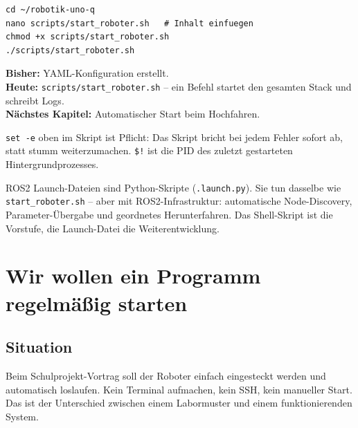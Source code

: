 \begin{loesungBox}
\begin{lstlisting}[style=bash]
cd ~/robotik-uno-q
nano scripts/start_roboter.sh   # Inhalt einfuegen
chmod +x scripts/start_roboter.sh
./scripts/start_roboter.sh
\end{lstlisting}
\end{loesungBox}

\begin{projektBox}
\textbf{Bisher:} YAML-Konfiguration erstellt.\\
\textbf{Heute:} \texttt{scripts/start\_roboter.sh} -- ein Befehl
startet den gesamten Stack und schreibt Logs.\\
\textbf{Nächstes Kapitel:} Automatischer Start beim Hochfahren.
\end{projektBox}

\begin{merksatzBox}
\texttt{set -e} oben im Skript ist Pflicht: Das Skript bricht
bei jedem Fehler sofort ab, statt stumm weiterzumachen.
\texttt{\$!} ist die PID des zuletzt gestarteten Hintergrundprozesses.
\end{merksatzBox}

\begin{robotikBox}
ROS2 Launch-Dateien sind Python-Skripte (\texttt{.launch.py}).
Sie tun dasselbe wie \texttt{start\_roboter.sh} -- aber mit
ROS2-Infrastruktur: automatische Node-Discovery, Parameter-Übergabe
und geordnetes Herunterfahren.
Das Shell-Skript ist die Vorstufe, die Launch-Datei die Weiterentwicklung.
\end{robotikBox}

\chapter{Wir wollen ein Programm regelmäßig starten}

\kapitelstruktur

\section{Situation}

Beim Schulprojekt-Vortrag soll der Roboter einfach eingesteckt
werden und automatisch loslaufen. Kein Terminal aufmachen,
kein SSH, kein manueller Start. Das ist der Unterschied
zwischen einem Labormuster und einem funktionierenden System.

